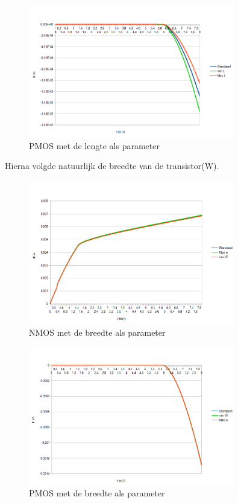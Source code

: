 \documentclass{article}
\begin{document}
\begin{figure}[H]
	\centering
	\includegraphics[width=0.8\textwidth]{pmoslengte}
	\caption{PMOS met de lengte als parameter}
\end{figure}

\clearpage
Hierna volgde natuurlijk de breedte van de transistor(W).

\begin{figure}[H]
	\centering
	\includegraphics[width=0.8\textwidth]{nmosbreedte}
	\caption{NMOS met de breedte als parameter}
\end{figure}

\begin{figure}[H]
	\centering
	\includegraphics[width=0.8\textwidth]{pmosbreedte}
	\caption{PMOS met de breedte als parameter}
\end{figure}
\clearpage
\end{document}

